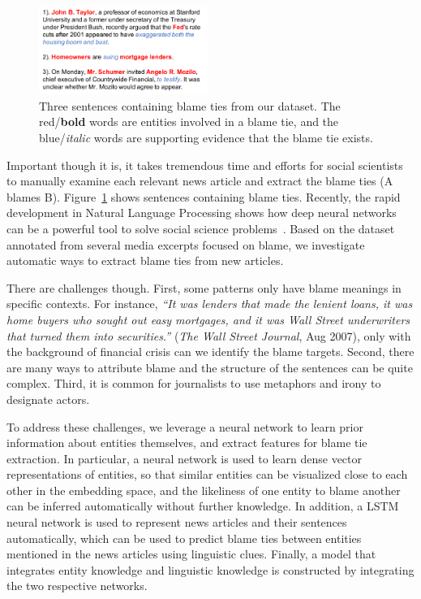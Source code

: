 \documentclass[11pt,a4paper]{article}
\begin{document}
\begin{figure}[t!]
\centering
\includegraphics[width=0.49\textwidth]{demo}
\caption{Three sentences containing blame ties from our dataset. The red/{\bf bold} words are entities involved in a blame tie, and the blue/{\it italic} words are supporting evidence that the blame tie exists.}
\label{figure:introdemo}
\end{figure}

Important though it is, it takes tremendous time and efforts for social scientists to manually examine each relevant news article and extract the blame ties (A blames B). Figure~\ref{figure:introdemo} shows sentences containing blame ties. Recently, the rapid development in Natural Language Processing shows how deep neural networks can be a powerful tool to solve social science problems~\cite{rule2015lexical,bail2016combining}. Based on the dataset annotated from several media excerpts focused on blame, we investigate automatic ways to extract blame ties from new articles.

There are challenges though. First, some patterns only have blame meanings in specific contexts. For instance, {\it ``It was lenders that made the lenient loans, it was home buyers who sought out easy mortgages, and it was Wall Street underwriters that turned them into securities.''} ({\it The Wall Street Journal}, Aug 2007), only with the background of financial crisis can we identify the blame targets. Second, there are many ways to attribute blame and the structure of the sentences can be quite complex. Third, it is common for journalists to use metaphors and irony to designate actors.

To address these challenges, we leverage a neural network to learn prior information about entities themselves, and extract features for blame tie extraction. In particular, a neural network is used to learn dense vector representations of entities, so that similar entities can be visualized close to each other in the embedding space, and the likeliness of one entity to blame another can be inferred automatically without further knowledge. In addition, a LSTM neural network is used to represent news articles and their sentences automatically, which can be used to predict blame ties between entities mentioned in the news articles using linguistic clues. Finally, a model that integrates entity knowledge and linguistic knowledge is constructed by integrating the two respective networks. 
\end{document}
